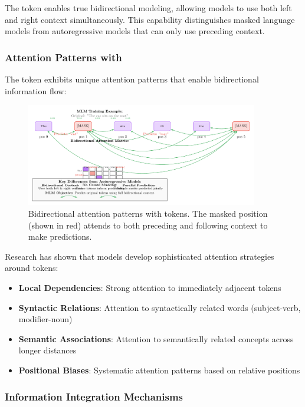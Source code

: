 The \mask{} token enables true bidirectional modeling, allowing models to use both left and right context simultaneously. This capability distinguishes masked language models from autoregressive models that can only use preceding context.

\subsubsection{Attention Patterns with \mask{}}

The \mask{} token exhibits unique attention patterns that enable bidirectional information flow:

\begin{figure}[htbp]
\centering
\includegraphics[width=0.9\textwidth]{part1/chapter03/fig_mask_attention.pdf}
\caption{Bidirectional attention patterns with \mask{} tokens. The masked position (shown in red) attends to both preceding and following context to make predictions.}
\label{fig:mask_attention}
\end{figure}

Research has shown that models develop sophisticated attention strategies around \mask{} tokens:

\begin{itemize}
\item \textbf{Local Dependencies}: Strong attention to immediately adjacent tokens
\item \textbf{Syntactic Relations}: Attention to syntactically related words (subject-verb, modifier-noun)
\item \textbf{Semantic Associations}: Attention to semantically related concepts across longer distances
\item \textbf{Positional Biases}: Systematic attention patterns based on relative positions
\end{itemize}

\subsubsection{Information Integration Mechanisms}

